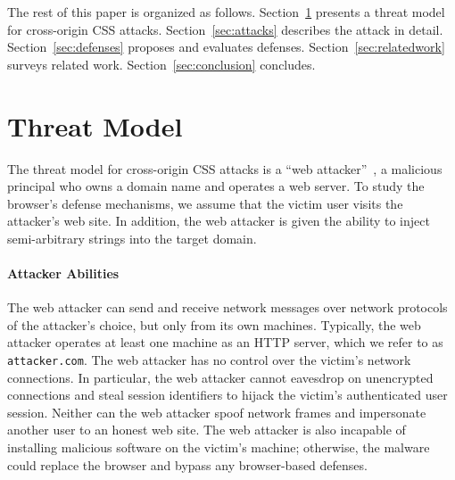 \documentclass{acm_proc_article-sp}
\begin{document}
The rest of this paper is organized as follows. Section~\ref{sec:threatmodel} presents a threat model for cross-origin CSS  attacks.
Section~\ref{sec:attacks} describes the attack in detail. Section~\ref{sec:defenses} proposes and evaluates defenses.
Section~\ref{sec:relatedwork} surveys related work.
Section~\ref{sec:conclusion} concludes.

% 

% 

\section{Threat Model} \label{sec:threatmodel}

The threat model for cross-origin CSS attacks is a ``web
attacker''~\cite{jackson09thesis}, a malicious principal who owns a domain
name and operates a web server. To study the browser's defense mechanisms, we
assume that the victim user visits the attacker's web site. In addition, the
web attacker is given the ability to inject semi-arbitrary strings into the
target domain.
% 

\paragraph{Attacker Abilities}
The web attacker can send and receive network messages over network protocols of the attacker's choice, but only from its own machines. Typically, the web attacker operates at least one machine as an HTTP server, which we refer to as \texttt{attacker.com}. The web attacker has no control over the victim's network connections. In particular, the web attacker cannot eavesdrop on unencrypted connections and steal session identifiers to hijack the victim's authenticated user session. Neither can the web attacker spoof network frames and impersonate another user to an honest web site.
The web attacker is also incapable of installing malicious software on the victim's machine; otherwise, the malware could replace the browser and bypass any browser-based defenses.
\end{document}
